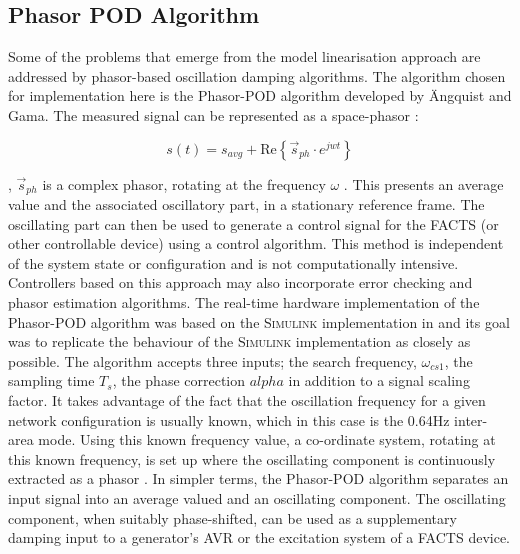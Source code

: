 \documentclass[journal]{IEEEtran}
\begin{document}
\subsection{Phasor POD Algorithm}

Some of the problems that emerge from the model linearisation approach are addressed by phasor-based oscillation damping algorithms. The algorithm chosen for implementation here is the Phasor-POD algorithm developed by \"{A}ngquist and Gama\cite{PhasorPOD}. The measured signal can be represented as a space-phasor \cite{Chaudhuri}: 

\begin{equation}
s(t)={s}_{avg}+\mathrm{Re}\left\{{\stackrel{\to }{s}}_{ph}\cdot {e}^{{jwt}}\right\}
\end{equation}

, $\stackrel{\to }{s}_{ph}$ is a complex phasor, rotating at the frequency $\omega$ \cite{PhasorPOD}. This presents an average value and the associated oscillatory part, in a stationary reference frame. The oscillating part can then be used to generate a control signal for the FACTS (or other controllable device) using a control algorithm. This method is independent of the system state or configuration and is not computationally intensive. Controllers based on this approach may also incorporate error checking and phasor estimation algorithms. The real-time hardware implementation of the Phasor-POD algorithm was based on the \textsc{Simulink} implementation in \cite{PhasorPODImplement} and its goal was to replicate the behaviour of the \textsc{Simulink} implementation as closely as possible. The algorithm accepts three inputs; the search frequency, $\omega_{cs1}$, the sampling time $T_{s}$, the phase correction $alpha$ in addition to a signal scaling factor. It takes advantage of the fact that the oscillation frequency for a given network configuration is usually known, which in this case is the 0.64Hz inter-area mode. Using this known frequency value, a  co-ordinate system, rotating at this known frequency, is set up where the oscillating component is continuously extracted as a phasor \cite{PhasorPOD}. In simpler terms, the Phasor-POD algorithm separates an input signal into an average valued and an oscillating component. The oscillating component, when suitably phase-shifted, can be used as a supplementary damping input to a generator's AVR or the excitation system of a FACTS device.
\end{document}

